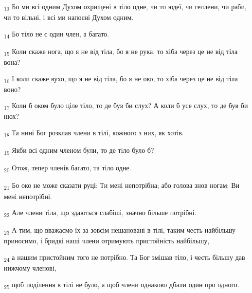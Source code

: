 \begin{tcolorbox}
\textsubscript{13} Бо ми всі одним Духом охрищені в тіло одне, чи то юдеї, чи геллени, чи раби, чи то вільні, і всі ми напоєні Духом одним.
\end{tcolorbox}
\begin{tcolorbox}
\textsubscript{14} Бо тіло не є один член, а багато.
\end{tcolorbox}
\begin{tcolorbox}
\textsubscript{15} Коли скаже нога, що я не від тіла, бо я не рука, то хіба через це не від тіла вона?
\end{tcolorbox}
\begin{tcolorbox}
\textsubscript{16} І коли скаже вухо, що я не від тіла, бо я не око, то хіба через це не від тіла воно?
\end{tcolorbox}
\begin{tcolorbox}
\textsubscript{17} Коли б оком було ціле тіло, то де був би слух? А коли б усе слух, то де був би нюх?
\end{tcolorbox}
\begin{tcolorbox}
\textsubscript{18} Та нині Бог розклав члени в тілі, кожного з них, як хотів.
\end{tcolorbox}
\begin{tcolorbox}
\textsubscript{19} Якби всі одним членом були, то де тіло було б?
\end{tcolorbox}
\begin{tcolorbox}
\textsubscript{20} Отож, тепер членів багато, та тіло одне.
\end{tcolorbox}
\begin{tcolorbox}
\textsubscript{21} Бо око не може сказати руці: Ти мені непотрібна; або голова знов ногам: Ви мені непотрібні.
\end{tcolorbox}
\begin{tcolorbox}
\textsubscript{22} Але члени тіла, що здаються слабіші, значно більше потрібні.
\end{tcolorbox}
\begin{tcolorbox}
\textsubscript{23} А тим, що вважаємо їх за зовсім нешановані в тілі, таким честь найбільшу приносимо, і бридкі наші члени отримують пристойність найбільшу,
\end{tcolorbox}
\begin{tcolorbox}
\textsubscript{24} а нашим пристойним того не потрібно. Та Бог змішав тіло, і честь більшу дав нижчому членові,
\end{tcolorbox}
\begin{tcolorbox}
\textsubscript{25} щоб поділення в тілі не було, а щоб члени однаково дбали один про одного.
\end{tcolorbox}
